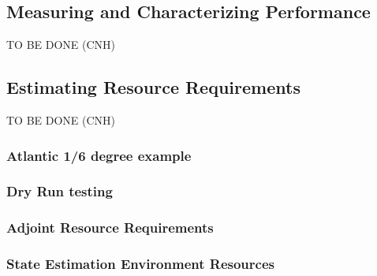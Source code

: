 \subsection{Measuring and Characterizing Performance}

TO BE DONE (CNH)

\subsection{Estimating Resource Requirements}

TO BE DONE (CNH) 

\subsubsection{Atlantic 1/6 degree example}
\subsubsection{Dry Run testing}
\subsubsection{Adjoint Resource Requirements}
\subsubsection{State Estimation Environment Resources}


